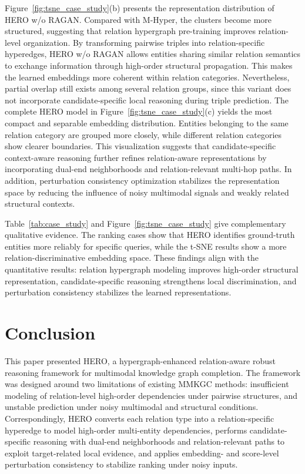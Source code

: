 \documentclass[a4paper,fleqn]{cas-sc}
\begin{document}
Figure~\ref{fig:tsne_case_study}(b) presents the representation distribution of HERO w/o RAGAN. Compared with M-Hyper, the clusters become more structured, suggesting that relation hypergraph pre-training improves relation-level organization. By transforming pairwise triples into relation-specific hyperedges, HERO w/o RAGAN allows entities sharing similar relation semantics to exchange information through high-order structural propagation. This makes the learned embeddings more coherent within relation categories. Nevertheless, partial overlap still exists among several relation groups, since this variant does not incorporate candidate-specific local reasoning during triple prediction. The complete HERO model in Figure~\ref{fig:tsne_case_study}(c) yields the most compact and separable embedding distribution. Entities belonging to the same relation category are grouped more closely, while different relation categories show clearer boundaries. This visualization suggests that candidate-specific context-aware reasoning further refines relation-aware representations by incorporating dual-end neighborhoods and relation-relevant multi-hop paths. In addition, perturbation consistency optimization stabilizes the representation space by reducing the influence of noisy multimodal signals and weakly related structural contexts.

Table~\ref{tab:case_study} and Figure~\ref{fig:tsne_case_study} give complementary qualitative evidence. The ranking cases show that HERO identifies ground-truth entities more reliably for specific queries, while the t-SNE results show a more relation-discriminative embedding space. These findings align with the quantitative results: relation hypergraph modeling improves high-order structural representation, candidate-specific reasoning strengthens local discrimination, and perturbation consistency stabilizes the learned representations.

\section{Conclusion}
\label{sec:conclusion}
This paper presented HERO, a hypergraph-enhanced relation-aware robust reasoning framework for multimodal knowledge graph completion. The framework was designed around two limitations of existing MMKGC methods: insufficient modeling of relation-level high-order dependencies under pairwise structures, and unstable prediction under noisy multimodal and structural conditions. Correspondingly, HERO converts each relation type into a relation-specific hyperedge to model high-order multi-entity dependencies, performs candidate-specific reasoning with dual-end neighborhoods and relation-relevant paths to exploit target-related local evidence, and applies embedding- and score-level perturbation consistency to stabilize ranking under noisy inputs.
\end{document}
